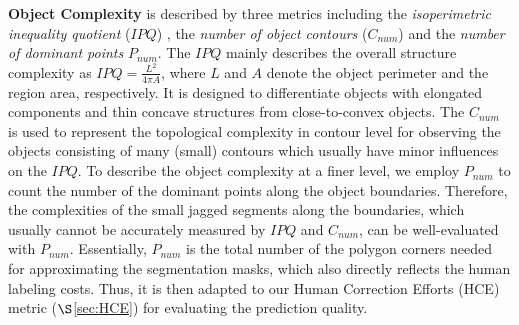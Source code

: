 \textbf{Object Complexity} is described by three metrics including the \textit{isoperimetric inequality quotient} ($IPQ$) \cite{osserman1978isoperimetric,watson2012perimetric,yang2020meticulous}, the \textit{number of object contours} ($C_{num}$) and the \textit{number of dominant points} $P_{num}$. The $IPQ$ mainly describes the overall structure complexity as $IPQ = \frac{L^2}{4\pi A}$, where $L$ and $A$ denote the object perimeter and the region area, respectively. It is designed to differentiate objects with elongated components and thin concave structures from close-to-convex objects. The $C_{num}$ is used to represent the topological complexity in contour level for observing the objects consisting of many (small) contours which usually have minor influences on the $IPQ$. To describe the object complexity at a finer level, we employ $P_{num}$ to count the number of the dominant points \cite{DBLP:journals/cvgip/Ramer72} along the object boundaries. Therefore, the complexities of the small jagged segments along the boundaries, which usually cannot be accurately measured by $IPQ$ and $C_{num}$, can be well-evaluated with $P_{num}$. Essentially, $P_{num}$ is the total number of the polygon corners needed for approximating the segmentation masks, which also directly reflects the human labeling costs. Thus, it is then adapted to our Human Correction Efforts (HCE) metric ($\S$\ref{sec:HCE}) for evaluating the prediction quality.

